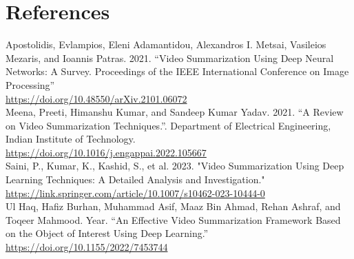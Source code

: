 \documentclass{bscs}
\begin{document}
\chapter{References}

Apostolidis, Evlampios, Eleni Adamantidou, Alexandros I. Metsai, Vasileios Mezaris, and
Ioannis Patras. 2021. “Video Summarization Using Deep Neural Networks: A Survey.
Proceedings of the IEEE International Conference on Image Processing”\\
\url{https://doi.org/10.48550/arXiv.2101.06072}\\

Meena, Preeti, Himanshu Kumar, and Sandeep Kumar Yadav. 2021. “A Review on Video
Summarization Techniques.”. Department of Electrical Engineering, Indian Institute of
Technology.\\
\url{https://doi.org/10.1016/j.engappai.2022.105667}\\

Saini, P., Kumar, K., Kashid, S., et al. 2023. "Video Summarization Using Deep Learning
Techniques: A Detailed Analysis and Investigation." \\
\url{https://link.springer.com/article/10.1007/s10462-023-10444-0}\\

Ul Haq, Hafiz Burhan, Muhammad Asif, Maaz Bin Ahmad, Rehan Ashraf, and Toqeer
Mahmood. Year. “An Effective Video Summarization Framework Based on the Object of
Interest Using Deep Learning.” \\
\url{https://doi.org/10.1155/2022/7453744}
\end{document}
